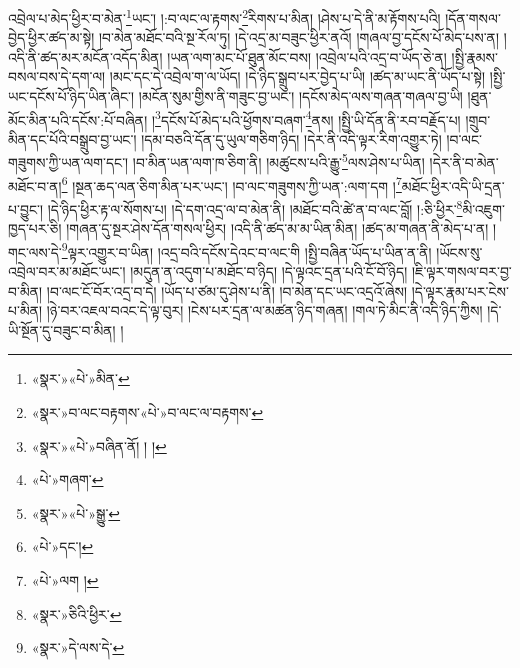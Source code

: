 འབྲེལ་པ་མེད་ཕྱིར་བ་མེན་\footnote{«སྣར་»«པེ་»མིན་}ཡང་། །:བ་ལང་ལ་རྟགས་\footnote{«སྣར་»བ་ལང་བརྟགས་«པེ་»བ་ལང་ལ་བརྟགས་}རིགས་པ་མིན། །ཤེས་པ་དེ་ནི་མ་རྟོགས་པའི། །དོན་གསལ་བྱེད་ཕྱིར་ཚད་མ་སྟེ། །བ་མེན་མཐོང་བའི་སྔ་རོལ་ཏུ། །དེ་འདྲ་མ་བཟུང་ཕྱིར་ནའོ། །གཞལ་བྱ་དངོས་པོ་མེད་པས་ན། །འདི་ནི་ཚད་མར་མངོན་འདོད་མིན། །ཡན་ལག་མང་པོ་ཐུན་མོང་བས། །འབྲེལ་པའི་འདྲ་བ་ཡོད་ཅེ་ན། །སྤྱི་རྣམས་བསལ་བས་དེ་དག་ལ། །མང་དང་དེ་འབྲེལ་ག་ལ་ཡོད། །དེ་ཉིད་སྒྲུབ་པར་བྱེད་པ་ཡི། །ཚད་མ་ཡང་ནི་ཡོད་པ་སྟེ། །སྤྱི་ཡང་དངོས་པོ་ཉིད་ཡིན་ཞིང་། །མངོན་སུམ་གྱིས་ནི་གཟུང་བྱ་ཡང་། །དངོས་མེད་ལས་གཞན་གཞལ་བྱ་ཡི། །ཐུན་མོང་མིན་པའི་དངོས་:པོ་བཞིན། །\footnote{«སྣར་»«པེ་»བཞིན་ནོ། ། །}དངོས་པོ་མེད་པའི་ཕྱོགས་བཞག་\footnote{«པེ་»གཞག་}ནས། །སྤྱི་ཡི་དོན་ནི་རབ་བརྗོད་པ། །གྲུབ་མིན་དང་པོའི་བསྒྲུབ་བྱ་ཡང་། །དམ་བཅའི་དོན་དུ་ཡུལ་གཅིག་ཉིད། །དེར་ནི་འདི་ལྟར་རིག་འགྱུར་ཏེ། །བ་ལང་གཟུགས་ཀྱི་ཡན་ལག་དང་། །བ་མིན་ཡན་ལག་ཁ་ཅིག་ནི། །མཚུངས་པའི་རྒྱུ་\footnote{«སྣར་»«པེ་»སྒྱུ་}ལས་ཤེས་པ་ཡིན། །དེར་ནི་བ་མེན་མཐོང་བ་ན།\footnote{«པེ་»དང་།} །སྔན་ཆད་ལན་ཅིག་མིན་པར་ཡང་། །བ་ལང་གཟུགས་ཀྱི་ཡན་:ལག་དག །\footnote{«པེ་»ལག །}མཐོང་ཕྱིར་འདི་ཡི་དྲན་པ་བྱུང་། །དེ་ཉིད་ཕྱིར་རྟ་ལ་སོགས་པ། །དེ་དག་འདྲ་ལ་བ་མེན་ནི། །མཐོང་བའི་ཚེ་ན་བ་ལང་བློ། །:ཅི་ཕྱིར་\footnote{«སྣར་»ཅིའི་ཕྱིར་}མི་འཇུག་ཁྱད་པར་ཅི། །གཞན་དུ་སྔར་ཤེས་དོན་གསལ་ཕྱིར། །འདི་ནི་ཚད་མ་མ་ཡིན་མིན། །ཚད་མ་གཞན་ནི་མེད་པ་ན། །གང་ལས་དེ་\footnote{«སྣར་»དེ་ལས་དེ་}ལྟར་འགྱུར་བ་ཡིན། །འདྲ་བའི་དངོས་དེའང་བ་ལང་གི །སྤྱི་བཞིན་ཡོད་པ་ཡིན་ན་ནི། །ཡོངས་སུ་འབྲེལ་བར་མ་མཐོང་ཡང་། །མདུན་ན་འདུག་པ་མཐོང་བ་ཉིད། །དེ་ལྟའང་དྲན་པའི་ངོ་བོ་ཉིད། །ཇི་ལྟར་གསལ་བར་བྱ་བ་མིན། །བ་ལང་ངོ་བོར་འདྲ་བ་དེ། །ཡོད་པ་ཙམ་དུ་ཤེས་པ་ནི། །བ་མེན་དང་ཡང་འདྲའོ་ཞེས། །དེ་ལྟར་རྣམ་པར་ངེས་པ་མིན། །ཉེ་བར་འཇལ་བའང་དེ་ལྟ་བུར། །ངེས་པར་དྲན་ལ་མཚན་ཉིད་གཞན། །གལ་ཏེ་མིང་ནི་འདི་ཉིད་ཀྱིས། །དེ་ཡི་སྔོན་དུ་བཟུང་བ་མིན། །
